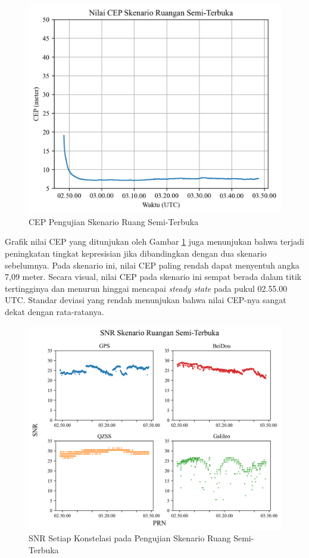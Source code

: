 \begin{figure}[H]
	\centering
	\includegraphics[width=13cm]{contents/chapter-4/3-skenario-semioutdoor/cep.png}
	\caption{CEP Pengujian Skenario Ruang Semi-Terbuka}
	\label{Fig: semioutdoor-cep}
\end{figure}

Grafik nilai CEP yang ditunjukan oleh Gambar \ref{Fig: semioutdoor-cep} juga menunjukan bahwa terjadi peningkatan tingkat kepresisian jika dibandingkan dengan dua skenario sebelumnya. Pada skenario ini, nilai CEP paling rendah dapat menyentuh angka 7,09 meter. Secara visual, nilai CEP pada skenario ini sempat berada dalam titik tertingginya dan menurun hinggai mencapai \textit{steady state} pada pukul 02.55.00 UTC. Standar deviasi yang rendah menunjukan bahwa nilai CEP-nya sangat dekat dengan rata-ratanya.

\begin{figure}[H]
	\centering
	\includegraphics[width=13cm]{contents/chapter-4/3-skenario-semioutdoor/snr.png}
	\caption{SNR Setiap Konstelasi pada Pengujian Skenario Ruang Semi-Terbuka}
	\label{Fig: semioutdoor-snr}
\end{figure}

